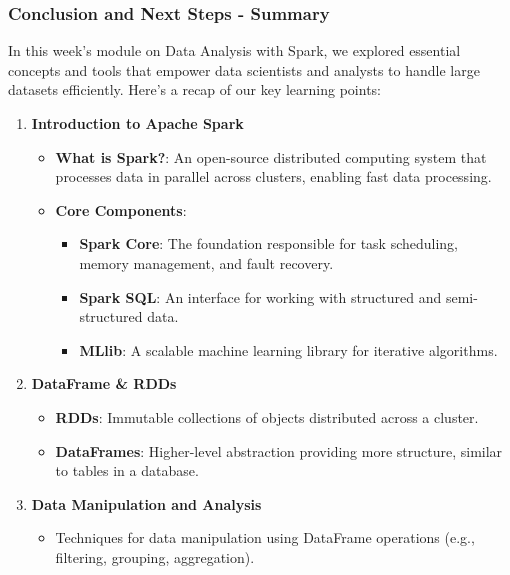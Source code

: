 \documentclass[aspectratio=169]{beamer}
\begin{document}
\begin{frame}[fragile]
    \frametitle{Conclusion and Next Steps - Summary}
    In this week’s module on Data Analysis with Spark, we explored essential concepts and tools that empower data scientists and analysts to handle large datasets efficiently. Here's a recap of our key learning points:
    
    \begin{enumerate}
        \item \textbf{Introduction to Apache Spark}
        \begin{itemize}
            \item \textbf{What is Spark?}: An open-source distributed computing system that processes data in parallel across clusters, enabling fast data processing.
            \item \textbf{Core Components}: 
            \begin{itemize}
                \item \textbf{Spark Core}: The foundation responsible for task scheduling, memory management, and fault recovery.
                \item \textbf{Spark SQL}: An interface for working with structured and semi-structured data.
                \item \textbf{MLlib}: A scalable machine learning library for iterative algorithms.
            \end{itemize}
        \end{itemize}

        \item \textbf{DataFrame \& RDDs}
        \begin{itemize}
            \item \textbf{RDDs}: Immutable collections of objects distributed across a cluster.
            \item \textbf{DataFrames}: Higher-level abstraction providing more structure, similar to tables in a database.
        \end{itemize}
        
        \item \textbf{Data Manipulation and Analysis}
        \begin{itemize}
            \item Techniques for data manipulation using DataFrame operations (e.g., filtering, grouping, aggregation).
        \end{itemize}
    \end{enumerate}
\end{frame}
\end{document}
